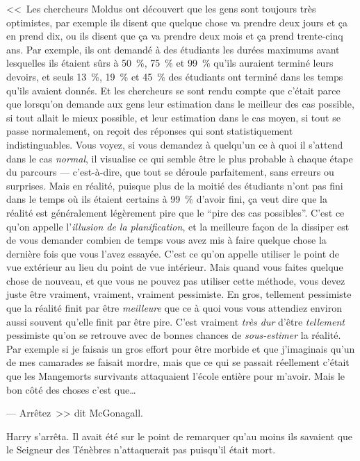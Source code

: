 <<~Les chercheurs Moldus ont découvert que les gens sont toujours très optimistes, par exemple ils disent que quelque chose va prendre deux jours et ça en prend dix, ou ils disent que ça va prendre deux mois et ça prend trente-cinq ans. Par exemple, ils ont demandé à des étudiants les durées maximums avant lesquelles ils étaient sûrs à 50~\%, 75~\% et 99~\% qu'ils auraient terminé leurs devoirs, et seuls 13~\%, 19~\% et 45~\% des étudiants ont terminé dans les temps qu'ils avaient donnés. Et les chercheurs se sont rendu compte que c'était parce que lorsqu'on demande aux gens leur estimation dans le meilleur des cas possible, si tout allait le mieux possible, et leur estimation dans le cas moyen, si tout se passe normalement, on reçoit des réponses qui sont statistiquement indistinguables. Vous voyez, si vous demandez à quelqu'un ce à quoi il s'attend dans le cas \emph{normal}, il visualise ce qui semble être le plus probable à chaque étape du parcours — c'est-à-dire, que tout se déroule parfaitement, sans erreurs ou surprises. Mais en réalité, puisque plus de la moitié des étudiants n'ont pas fini dans le temps où ils étaient certains à 99~\% d'avoir fini, ça veut dire que la réalité est généralement légèrement pire que le “pire des cas possibles”. C'est ce qu'on appelle l'\emph{illusion de la planification}, et la meilleure façon de la dissiper est de vous demander combien de temps vous avez mis à faire quelque chose la dernière fois que vous l'avez essayée. C'est ce qu'on appelle utiliser le point de vue extérieur au lieu du point de vue intérieur. Mais quand vous faites quelque chose de nouveau, et que vous ne pouvez pas utiliser cette méthode, vous devez juste être vraiment, vraiment, vraiment pessimiste. En gros, tellement pessimiste que la réalité finit par être \emph{meilleure} que ce à quoi vous vous attendiez environ aussi souvent qu'elle finit par être pire. C'est vraiment \emph{très dur} d'être \emph{tellement} pessimiste qu'on se retrouve avec de bonnes chances de \emph{sous-estimer} la réalité. Par exemple si je faisais un gros effort pour être morbide et que j'imaginais qu'un de mes camarades se faisait mordre, mais que ce qui se passait réellement c'était que les Mangemorts survivants attaquaient l'école entière pour m'avoir. Mais le bon côté des choses c'est que…

--- Arrêtez~>> dit McGonagall.

Harry s'arrêta. Il avait été sur le point de remarquer qu'au moins ils savaient que le Seigneur des Ténèbres n'attaquerait pas puisqu'il était mort.

